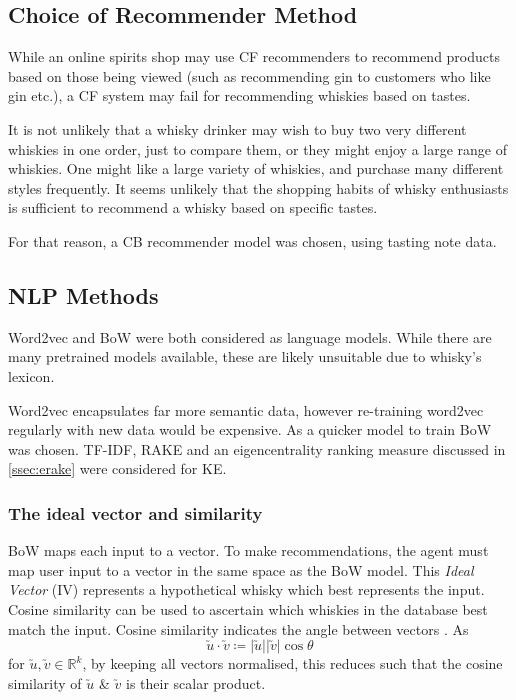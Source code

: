\subsection{Choice of Recommender Method}
While an online spirits shop may use CF recommenders to recommend products based on those being viewed
(such as recommending gin to customers who like gin etc.), a CF system may fail for
recommending whiskies based on tastes.

It is not unlikely that a whisky drinker may wish to buy two very different whiskies in one order, just 
to compare them, or they might enjoy a large range of whiskies. One might like a large
variety of whiskies, and purchase many different styles frequently. 
It seems unlikely that the shopping habits of whisky enthusiasts is sufficient to recommend a whisky
based on specific tastes.

For that reason, a CB recommender model was chosen, using tasting note data.

\subsection{NLP Methods}\label{whiskylang}
Word2vec and BoW were both considered as language models. While there are
many pretrained models available, these are likely unsuitable due to whisky's lexicon.

Word2vec encapsulates far more semantic data, however re-training
word2vec regularly with new data would be expensive. As a quicker model to train
BoW was chosen.  TF-IDF, RAKE and an eigencentrality ranking measure discussed in 
\autoref{ssec:erake} were considered for KE.

\subsubsection{The ideal vector and similarity}\label{sssec:cossim}
BoW maps each input to a vector. To make recommendations, the agent must
map user input to a vector in the same space as the BoW model. This
\emph{Ideal Vector} (IV) represents a hypothetical whisky which best represents 
the input. Cosine similarity can be used to ascertain which whiskies in 
the database best match the input.  Cosine similarity indicates the angle between
vectors \cite{Melville2010}. As  
\begin{equation}
    \utilde{u} \cdot \utilde{v} \coloneqq \vert \utilde{u} \vert \vert \utilde{v} \vert \cos{\theta}
\end{equation}
for $\utilde{u}, \utilde{v}\in \mathbb{R} ^{k}$, by keeping all vectors normalised, this reduces such
that the cosine similarity of $\utilde{u}$ \& $\utilde{v}$ is their scalar product.


